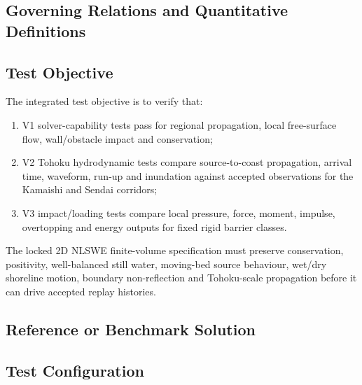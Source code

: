 \subsection{Governing Relations and Quantitative Definitions}
\label{sec:res-ver-spec-governing-relations}

%

\subsection{Test Objective}
\label{sec:res-ver-spec-test-objective}

The integrated test objective is to verify that:

\begin{enumerate}
  \item V1 solver-capability tests pass for regional propagation,
    local free-surface flow, wall/obstacle impact and conservation;
  \item V2 Tohoku hydrodynamic tests compare source-to-coast
    propagation, arrival time, waveform, run-up and inundation against
    accepted observations for the Kamaishi and Sendai corridors;
  \item V3 impact/loading tests compare local pressure, force, moment,
    impulse, overtopping and energy outputs for fixed rigid barrier
    classes.
\end{enumerate}

The locked 2D NLSWE finite-volume specification must preserve
conservation, positivity, well-balanced still water, moving-bed source
behaviour, wet/dry shoreline motion, boundary non-reflection and
Tohoku-scale propagation before it can drive accepted replay histories.

\subsection{Reference or Benchmark Solution}
\label{sec:res-ver-spec-reference-benchmark-solution}


\subsection{Test Configuration}
\label{sec:res-ver-spec-test-configuration}

